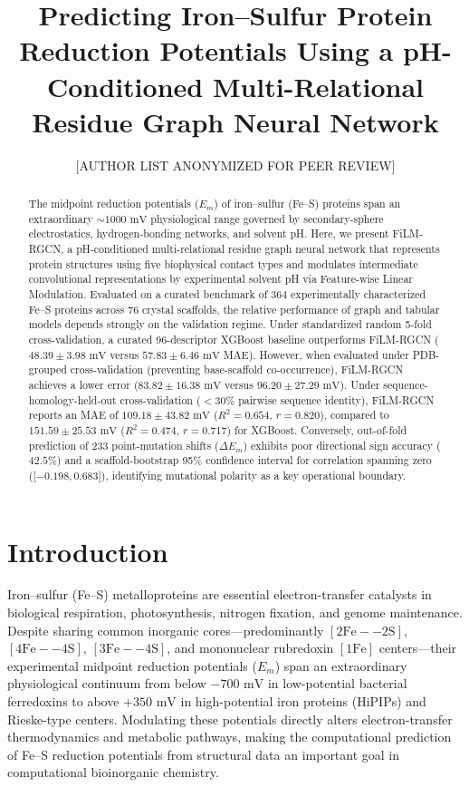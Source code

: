 \documentclass[journal=jcisd8,manuscript=article]{achemso}
\title{Predicting Iron--Sulfur Protein Reduction Potentials Using a pH-Conditioned Multi-Relational Residue Graph Neural Network}
\author{[AUTHOR LIST ANONYMIZED FOR PEER REVIEW]}
\affiliation{[INSTITUTION ANONYMIZED FOR PEER REVIEW]}
\begin{document}
\begin{abstract}
The midpoint reduction potentials ($E_m$) of iron--sulfur (Fe--S) proteins span an extraordinary $\sim 1000\text{ mV}$ physiological range governed by secondary-sphere electrostatics, hydrogen-bonding networks, and solvent pH. Here, we present FiLM-RGCN, a pH-conditioned multi-relational residue graph neural network that represents protein structures using five biophysical contact types and modulates intermediate convolutional representations by experimental solvent pH via Feature-wise Linear Modulation. Evaluated on a curated benchmark of 364 experimentally characterized Fe--S proteins across 76 crystal scaffolds, the relative performance of graph and tabular models depends strongly on the validation regime. Under standardized random 5-fold cross-validation, a curated 96-descriptor XGBoost baseline outperforms FiLM-RGCN ($48.39 \pm 3.98\text{ mV}$ versus $57.83 \pm 6.46\text{ mV}$ MAE). However, when evaluated under PDB-grouped cross-validation (preventing base-scaffold co-occurrence), FiLM-RGCN achieves a lower error ($83.82 \pm 16.38\text{ mV}$ versus $96.20 \pm 27.29\text{ mV}$). Under sequence-homology-held-out cross-validation ($<30\%$ pairwise sequence identity), FiLM-RGCN reports an MAE of $109.18 \pm 43.82\text{ mV}$ ($R^2 = 0.654$, $r = 0.820$), compared to $151.59 \pm 25.53\text{ mV}$ ($R^2 = 0.474$, $r = 0.717$) for XGBoost. Conversely, out-of-fold prediction of 233 point-mutation shifts ($\Delta E_m$) exhibits poor directional sign accuracy ($42.5\%$) and a scaffold-bootstrap 95\% confidence interval for correlation spanning zero ([$ -0.198, 0.683$]), identifying mutational polarity as a key operational boundary.
\end{abstract}

\section{Introduction}

Iron--sulfur (Fe--S) metalloproteins are essential electron-transfer catalysts in biological respiration, photosynthesis, nitrogen fixation, and genome maintenance.\cite{beinert1997iron,holm1996structural,cammack1992iron,johnson1998iron,lill2006iron} Despite sharing common inorganic cores---predominantly $[2\text{Fe}--2\text{S}]$, $[4\text{Fe}--4\text{S}]$, $[3\text{Fe}--4\text{S}]$, and mononuclear rubredoxin $[1\text{Fe}]$ centers---their experimental midpoint reduction potentials ($E_m$) span an extraordinary physiological continuum from below $-700\text{ mV}$ in low-potential bacterial ferredoxins to above $+350\text{ mV}$ in high-potential iron proteins (HiPIPs) and Rieske-type centers.\cite{beinert1997iron,stephens1996protein,cowan1993metalloprotein} Modulating these potentials directly alters electron-transfer thermodynamics and metabolic pathways,\cite{marcus1993electron,moser1992nature,marshall2009rationally} making the computational prediction of Fe--S reduction potentials from structural data an important goal in computational bioinorganic chemistry.
\end{document}
